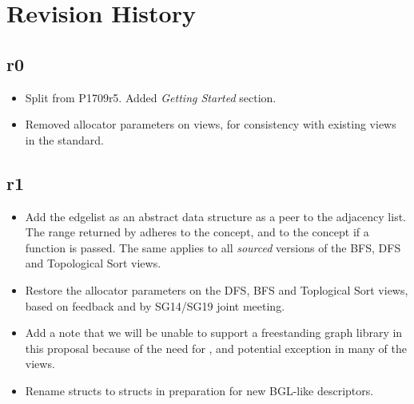 \section{Revision History}

\subsection*{\paperno r0}

\begin{itemize}
      \item Split from P1709r5. Added \textit{Getting Started} section.
      \item Removed allocator parameters on views, for consistency with existing views in the standard. 
\end{itemize}

\subsection*{\paperno r1}
\begin{itemize}
      \item Add the edgelist as an abstract data structure as a peer to the adjacency list. 
            The range returned by  adheres to the  concept,
            and to the  concept if a  function is passed. The same applies to
            all \textit{sourced} versions of the BFS, DFS and Topological Sort views.
      \item Restore the allocator parameters on the DFS, BFS and Toplogical Sort views, based on feedback and 
            by SG14/SG19 joint meeting.
      \item Add a note that we will be unable to support a freestanding graph library in this proposal because
            of the need for ,  and potential  exception in many of 
            the views.
      \item Rename  structs to  structs in preparation for new BGL-like descriptors.
\end{itemize}
